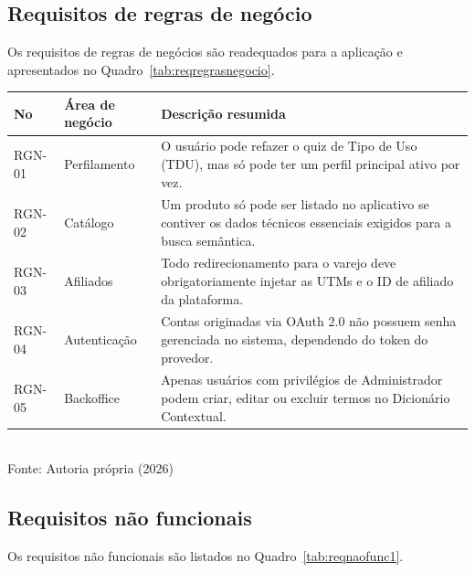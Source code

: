 \subsection {Requisitos de regras de negócio}
Os requisitos de regras de negócios são readequados para a aplicação e apresentados no Quadro~\ref{tab:reqregrasnegocio}.

\begin{quadro}[!htbp]
\centering
\caption{Requisitos de regras de negócio}
	\begin{tabular}{ | m{1.7cm} | m{3cm}| m{10cm} | }
		\hline
		\cellcolor{gray!20}\textbf{No} & \cellcolor{gray!20}\textbf{Área de negócio} & \cellcolor{gray!20}\textbf{Descrição resumida} \\ \hline
        RGN-01 & Perfilamento & O usuário pode refazer o quiz de Tipo de Uso (TDU), mas só pode ter um perfil principal ativo por vez.\\ \hline
        RGN-02 & Catálogo & Um produto só pode ser listado no aplicativo se contiver os dados técnicos essenciais exigidos para a busca semântica.\\ \hline
        RGN-03 & Afiliados & Todo redirecionamento para o varejo deve obrigatoriamente injetar as UTMs e o ID de afiliado da plataforma.\\ \hline
        RGN-04 & Autenticação & Contas originadas via OAuth 2.0 não possuem senha gerenciada no sistema, dependendo do token do provedor.\\ \hline
        RGN-05 & Backoffice & Apenas usuários com privilégios de Administrador podem criar, editar ou excluir termos no Dicionário Contextual.\\ \hline             
	\end{tabular}
	\\ \vspace{0.2cm}
	Fonte: Autoria própria (2026)
	\label{tab:reqregrasnegocio}
\end{quadro}


\subsection {Requisitos não funcionais}
Os requisitos não funcionais são listados no Quadro~\ref{tab:reqnaofunc1}.

